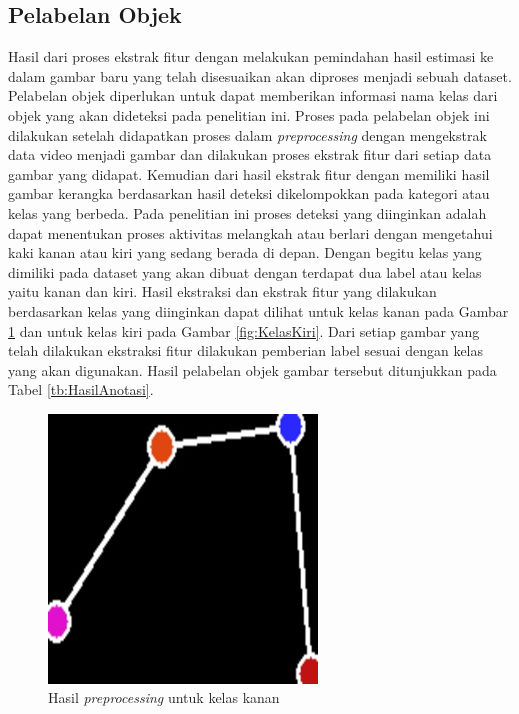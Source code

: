 \subsection{Pelabelan Objek}
\label{subsec:PelabelanObjek}

Hasil dari proses ekstrak fitur dengan melakukan pemindahan hasil estimasi ke dalam gambar baru yang telah disesuaikan akan diproses menjadi sebuah dataset. Pelabelan objek diperlukan untuk dapat memberikan informasi nama kelas dari objek yang akan dideteksi pada penelitian ini. Proses pada pelabelan objek ini dilakukan setelah didapatkan proses dalam \emph{preprocessing} dengan mengekstrak data video menjadi gambar dan dilakukan proses ekstrak fitur dari setiap data gambar yang didapat. Kemudian dari hasil ekstrak fitur dengan memiliki hasil gambar kerangka berdasarkan hasil deteksi dikelompokkan pada kategori atau kelas yang berbeda. Pada penelitian ini proses deteksi yang diinginkan adalah dapat menentukan proses aktivitas melangkah atau berlari dengan mengetahui kaki kanan atau kiri yang sedang berada di depan. Dengan begitu kelas yang dimiliki pada dataset yang akan dibuat dengan terdapat dua label atau kelas yaitu kanan dan kiri. Hasil ekstraksi dan ekstrak fitur yang dilakukan berdasarkan kelas yang diinginkan dapat dilihat untuk kelas kanan pada Gambar \ref{fig:KelasKanan} dan untuk kelas kiri pada Gambar \ref{fig:KelasKiri}. Dari setiap gambar yang telah dilakukan ekstraksi fitur dilakukan pemberian label sesuai dengan kelas yang akan digunakan. Hasil pelabelan objek gambar tersebut ditunjukkan pada Tabel \ref{tb:HasilAnotasi}.

\begin{figure}[H]
  \centering
  \includegraphics[scale=0.8]{gambar/dataset kanan.png}
  \caption{Hasil \emph{preprocessing} untuk kelas kanan}
  \label{fig:KelasKanan}
\end{figure}

